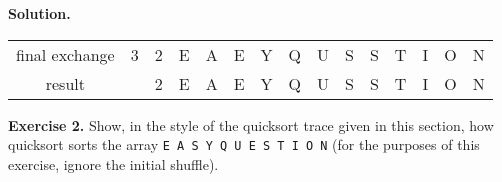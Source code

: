 \documentclass[12pt, a4paper]{article}
\newenvironment{ex}[2][Exercise]
{\par\medskip\noindent \textbf{#1 #2.}}
{\medskip}
\newenvironment{sol}[1][Solution]
{\par\medskip\noindent \textbf{#1.} }
{\medskip}
\begin{document}
\begin{sol}
\begin{center}
\begin{tabular}{c|cc|cccccccccccc}
				{\color{red} final exchange}
				& {\color{red} 3} & {\color{red} 2 }
				& {\color{red}E} & {\color{gray}A} & {\color{red} E} & {\color{gray} Y} & {\color{gray} Q} & {\color{gray} U} & {\color{gray}S} & {\color{gray}S}
				& {\color{gray}T} &{\color{gray}I} & {\color{gray}O} & {\color{gray}N}\\
				
				{\color{red} result}
				& {} & {\color{red} 2 }
				& {\color{black}E} & {\color{black}A} & {\color{black} E} & {\color{black} Y} & {\color{black} Q} & {\color{black} U} & {\color{black}S} & {\color{black}S}
				& {\color{black}T} &{\color{black}I} & {\color{black}O} & {\color{black}N}\\
			\end{tabular}
		\end{center}
	\end{sol}
	\begin{ex}{2}
		Show, in the style of the quicksort trace given in this section, how quicksort sorts
		the array \texttt{E A S Y Q U E S T I O N} (for the purposes of this exercise, ignore
		the initial shuffle).
	\end{ex}
\end{document}
